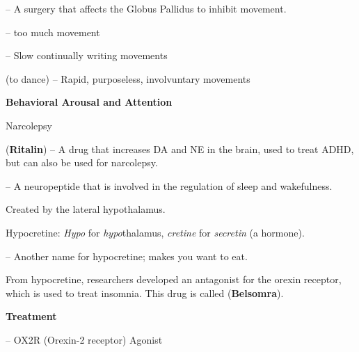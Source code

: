 \begin{coloredlist}
\begin{coloredlist}
\begin{coloredlist}
            \item {} -- A surgery that affects the Globus Pallidus to inhibit movement.
        \end{coloredlist}
        \item {} -- too much movement
        \begin{coloredlist}
            \item {} -- Slow continually writing movements
            \item {} (to dance) -- Rapid, purposeless, involvuntary movements
        \end{coloredlist}
    \end{coloredlist}
    \item \textbf{Behavioral Arousal and Attention}
    \begin{coloredlist}
        \item Narcolepsy
        \begin{coloredlist}
            \item {} (\textbf{Ritalin}) -- A drug that increases DA and NE in the brain, used to treat ADHD, but can also be used for narcolepsy.
            \item {} -- A neuropeptide that is involved in the regulation of sleep and wakefulness.
            \begin{coloredlist}
                \item Created by the lateral hypothalamus.
                \item Hypocretine: \textit{Hypo} for \textit{hypo}thalamus, \textit{cretine} for \textit{secretin} (a hormone).
                \item {} -- Another name for hypocretine; makes you want to eat.
            \end{coloredlist}
            \item From hypocretine, researchers developed an antagonist for the orexin receptor, which is used to treat insomnia. This drug is called  (\textbf{Belsomra}).
            \item \textbf{Treatment}
            \begin{coloredlist}
                \item {} -- OX2R (Orexin-2 receptor) Agonist

\end{coloredlist}
\end{coloredlist}
\end{coloredlist}
\end{coloredlist}
